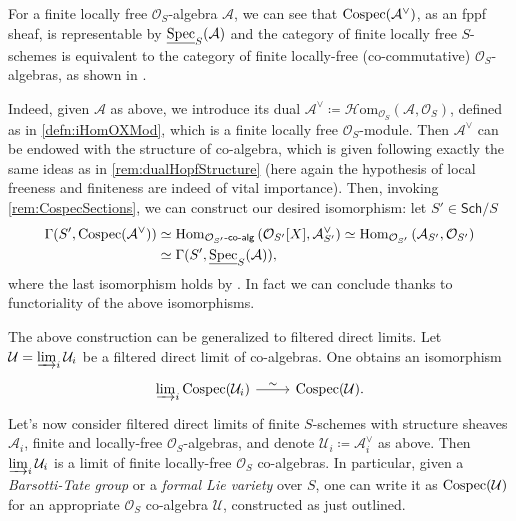 \begin{rem}[]
	For a finite locally free $\mathcal{O}_{ S }$-algebra $\mathcal{A}$,
	we can see that $\operatorname{Cospec}(\mathcal{A}^{\vee})$, as an fppf sheaf, is representable 
	by $\underline{\operatorname{Spec}}_S(\mathcal{A})$ and
	the category of finite locally free $S$-schemes
	is equivalent to the category of finite locally-free (co-commutative)
	$\mathcal{O}_{ S }$-algebras, as shown in 
	\cite[Chapter III, remark 2.1.2]{Messing}.

	Indeed, given $\mathcal{A}$ as above, we introduce its dual
	$\mathcal{A}^{\vee} \coloneqq \mathcal{H}\mathrm{om}_{\mathcal{O}_{ S }} 
	\left( \mathcal{A}, \mathcal{O}_{ S } \right)$,
	defined as in \cref{defn:iHomOXMod}, which is a
	finite locally free $\mathcal{O}_{ S }$-module.
	Then $\mathcal{A}^{\vee}$ can be endowed with the structure of co-algebra, which is
	given following exactly the same ideas as in \cref{rem:dualHopfStructure}
	(here again the hypothesis of local freeness and finiteness are indeed
	of vital importance).
	Then, invoking \cref{rem:CospecSections}, we can construct 
	our desired isomorphism: let $S' \in \mathsf{Sch}/S$
	\begin{align*}
		\Gamma(S', \operatorname{Cospec}(\mathcal{A}^{\vee})) &\simeq
		\operatorname{Hom}_{ \mathcal{O}_{ S' }\text{-}\mathsf{co}\text{-}\mathsf{alg}} 
		\left( \mathcal{O}_{ S' }[X], \mathcal{A}^\vee_{S'} \right) \simeq
		\operatorname{Hom}_{ \mathcal{O}_{ S' }}
		\left( \mathcal{A}_{S'}, \mathcal{O}_{ S' } \right) \\
		&\simeq
		\Gamma(S', \underline{\operatorname{Spec}}_S(\mathcal{A}))
	,\end{align*}
	where the last isomorphism holds by 
	\cite[\href{https://stacks.math.columbia.edu/tag/01LV}{Lemma 01LV}]{SP}.
	In fact we can conclude thanks to functoriality of the above isomorphisms.
\end{rem}


\begin{rem}
	The above construction can be generalized to
	filtered direct limits.
	Let $\mathcal{U} = \varinjlim_i \mathcal{U}_i$ be a filtered direct limit
	of co-algebras. One obtains an isomorphism
	\begin{equation*}
	\begin{tikzcd}[row sep = 0ex
		,/tikz/column 1/.append style={anchor=base east}
		,/tikz/column 2/.append style={anchor=base west}]
		\varinjlim_i \cospec(\mathcal{U}_i) \arrow[r, "\sim", rightarrow] &
		\cospec(\mathcal{U})
	.\end{tikzcd}
	\end{equation*} 
	Let's now consider filtered direct limits of 
	finite $S$-schemes with structure sheaves $\mathcal{A}_i$,
	finite and locally-free $\mathcal{O}_{ S }$-algebras, 
	and denote $\mathcal{U}_i \coloneqq \mathcal{A}_i^\vee$ as above.
	Then $\varinjlim_i \mathcal{U}_i$ is a limit 
	of finite locally-free $\mathcal{O}_{ S }$ co-algebras.
	In particular, given a \emph{Barsotti-Tate group} or a \emph{formal Lie variety}
	over $S$, one can write it as $\operatorname{Cospec}(\mathcal{U})$ for an appropriate 
	$\mathcal{O}_{ S }$ co-algebra $\mathcal{U}$, constructed as just outlined.
\end{rem}


